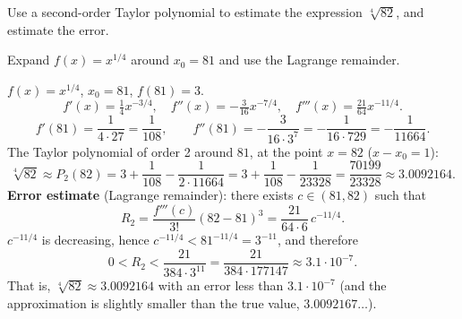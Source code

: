 
\begin{question}
Use a second-order Taylor polynomial to estimate the expression $\sqrt[4]{82}$, and estimate the error.
\end{question}

\begin{hint}
Expand $f(x)=x^{1/4}$ around $x_0=81$ and use the Lagrange remainder.
\end{hint}

\begin{solution}
$f(x)=x^{1/4}$, $x_0=81$, $f(81)=3$.
\[ f'(x)=\tfrac14x^{-3/4},\quad f''(x)=-\tfrac{3}{16}x^{-7/4},\quad f'''(x)=\tfrac{21}{64}x^{-11/4}. \]
\[ f'(81)=\frac{1}{4\cdot27}=\frac{1}{108},\qquad f''(81)=-\frac{3}{16\cdot 3^7}=-\frac{1}{16\cdot729}=-\frac{1}{11664}. \]
The Taylor polynomial of order 2 around $81$, at the point $x=82$ ($x-x_0=1$):
\[ \sqrt[4]{82}\approx P_2(82)=3+\frac{1}{108}-\frac{1}{2\cdot11664}=3+\frac{1}{108}-\frac{1}{23328}=\frac{70199}{23328}\approx 3.0092164. \]
\textbf{Error estimate} (Lagrange remainder): there exists $c\in(81,82)$ such that
\[ R_2=\frac{f'''(c)}{3!}(82-81)^3=\frac{21}{64\cdot 6}\,c^{-11/4}. \]
$c^{-11/4}$ is decreasing, hence $c^{-11/4}<81^{-11/4}=3^{-11}$, and therefore
\[ 0<R_2<\frac{21}{384\cdot 3^{11}}=\frac{21}{384\cdot177147}\approx 3.1\cdot10^{-7}. \]
That is, $\sqrt[4]{82}\approx3.0092164$ with an error less than $3.1\cdot 10^{-7}$ (and the approximation is slightly smaller than the true value, $3.0092167\ldots$).
\end{solution}
